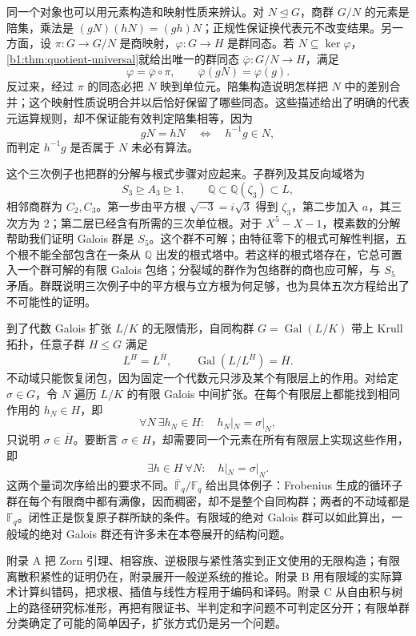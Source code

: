 \ProseParagraphBreak
同一个对象也可以用元素构造和映射性质来辨认。对 \(N\trianglelefteq G\)，商群 \(G/N\) 的元素是陪集，乘法是 \((gN)(hN)=(gh)N\)；正规性保证换代表元不改变结果。另一方面，设 \(\pi:G\rightarrow G/N\) 是商映射，\(\varphi:G\rightarrow H\) 是群同态。若 \(N\subseteq\ker\varphi\)，\cref{b1:thm:quotient-universal}就给出唯一的群同态 \(\overline\varphi:G/N\rightarrow H\)，满足
\[
	\varphi=\overline\varphi\circ\pi,\qquad \overline\varphi(gN)=\varphi(g).
\]
反过来，经过 \(\pi\) 的同态必把 \(N\) 映到单位元。陪集构造说明怎样把 \(N\) 中的差别合并；这个映射性质说明合并以后恰好保留了哪些同态。这些描述给出了明确的代表元运算规则，却不保证能有效判定陪集相等，因为
\[
	gN=hN\quad\Longleftrightarrow\quad h^{-1}g\in N,
\]
而判定 \(h^{-1}g\) 是否属于 \(N\) 未必有算法。

\ProseParagraphBreak
这个三次例子也把群的分解与根式步骤对应起来。子群列及其反向域塔为
\[
	S_3\trianglerighteq A_3\trianglerighteq1, \qquad \mathbb Q\subset\mathbb Q(\zeta_3)\subset L,
\]
相邻商群为 \(C_2,C_3\)。第一步由平方根 \(\sqrt{-3}=i\sqrt3\) 得到 \(\zeta_3\)，第二步加入 \(a\)，其三次方为 \(2\)；第二层已经含有所需的三次单位根。对于 \(X^5-X-1\)，模素数的分解帮助我们证明 Galois 群是 \(S_5\)。这个群不可解；由特征零下的根式可解性判据，五个根不能全部包含在一条从 \(\mathbb Q\) 出发的根式塔中。若这样的根式塔存在，它总可置入一个群可解的有限 Galois 包络；分裂域的群作为包络群的商也应可解，与 \(S_5\) 矛盾。群既说明三次例子中的平方根与立方根为何足够，也为具体五次方程给出了不可能性的证明。

\ProseParagraphBreak
到了代数 Galois 扩张 \(L/K\) 的无限情形，自同构群 \(G=\operatorname{Gal}(L/K)\) 带上 Krull 拓扑，任意子群 \(H\leq G\) 满足
\[
	L^H=L^{\overline H},\qquad \operatorname{Gal}(L/L^H)=\overline H.
\]
不动域只能恢复闭包，因为固定一个代数元只涉及某个有限层上的作用。对给定 \(\sigma\in G\)，令 \(N\) 遍历 \(L/K\) 的有限 Galois 中间扩张。在每个有限层上都能找到相同作用的 \(h_N\in H\)，即
\[
	\forall N\ \exists h_N\in H:\quad h_N|_N=\sigma|_N,
\]
只说明 \(\sigma\in\overline H\)。要断言 \(\sigma\in H\)，却需要同一个元素在所有有限层上实现这些作用，即
\[
	\exists h\in H\ \forall N:\quad h|_N=\sigma|_N.
\]
这两个量词次序给出的要求不同。\(\overline{\mathbb F}_q/\mathbb F_q\) 给出具体例子：Frobenius 生成的循环子群在每个有限商中都有满像，因而稠密，却不是整个自同构群；两者的不动域都是 \(\mathbb F_q\)。闭性正是恢复原子群所缺的条件。有限域的绝对 Galois 群可以如此算出，一般域的绝对 Galois 群还有许多未在本卷展开的结构问题。

\ProseParagraphBreak
附录 A 把 Zorn 引理、相容族、逆极限与紧性落实到正文使用的无限构造；有限离散积紧性的证明仍在，附录展开一般逆系统的推论。附录 B 用有限域的实际算术计算纠错码，把求根、插值与线性方程用于编码和译码。附录 C 从自由积与树上的路径研究标准形，再把有限证书、半判定和字问题不可判定区分开；有限单群分类确定了可能的简单因子，扩张方式仍是另一个问题。

